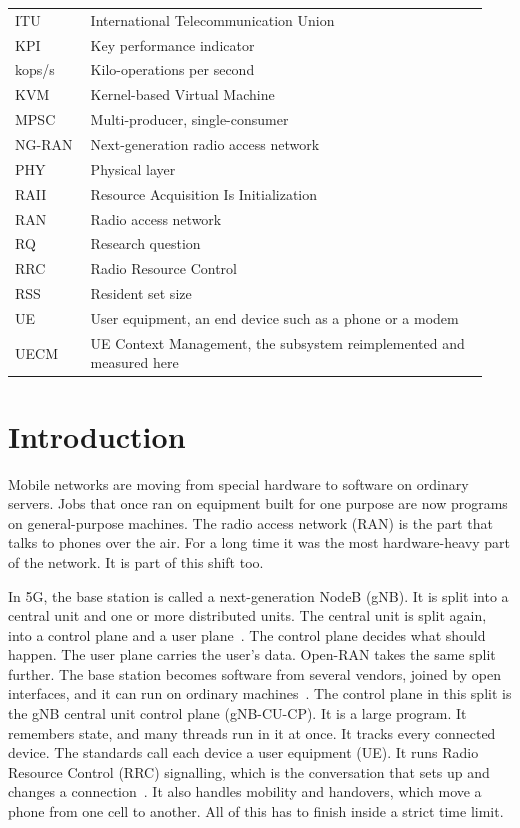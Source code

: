 \documentclass[english,oneside,a4paper,censored,csm,software-track-2020]{HYthesisML}
\begin{document}
\begin{longtable}{@{}p{0.15\linewidth} p{0.79\linewidth}@{}}
ITU & International Telecommunication Union \\
KPI & Key performance indicator \\
kops/s & Kilo-operations per second \\
KVM & Kernel-based Virtual Machine \\
MPSC & Multi-producer, single-consumer \\
NG-RAN & Next-generation radio access network \\
PHY & Physical layer \\
RAII & Resource Acquisition Is Initialization \\
RAN & Radio access network \\
RQ & Research question \\
RRC & Radio Resource Control \\
RSS & Resident set size \\
UE & User equipment, an end device such as a phone or a modem \\
UECM & UE Context Management, the subsystem reimplemented and measured here \\
\hline
\end{longtable}
\endgroup

\cleardoublepage
\mainmatter


\chapter{Introduction}

Mobile networks are moving from special hardware to software on ordinary servers.
Jobs that once ran on equipment built for one purpose are now programs on general-purpose machines.
The radio access network (RAN) is the part that talks to phones over the air.
For a long time it was the most hardware-heavy part of the network. It is part of this shift too.

In 5G, the base station is called a next-generation NodeB (gNB).
It is split into a central unit and one or more distributed units.
The central unit is split again, into a control plane and a user plane~\cite{3gpp38401,3gpp38300}.
The control plane decides what should happen. The user plane carries the user's data.
Open-RAN takes the same split further.
The base station becomes software from several vendors, joined by open interfaces, and it can run on ordinary machines~\cite{polese2023oran}.
The control plane in this split is the gNB central unit control plane (gNB-CU-CP).
It is a large program. It remembers state, and many threads run in it at once.
It tracks every connected device. The standards call each device a user equipment (UE).
It runs Radio Resource Control (RRC) signalling, which is the conversation that sets up and changes a connection~\cite{3gpp38331}.
It also handles mobility and handovers, which move a phone from one cell to another.
All of this has to finish inside a strict time limit.
\end{document}
